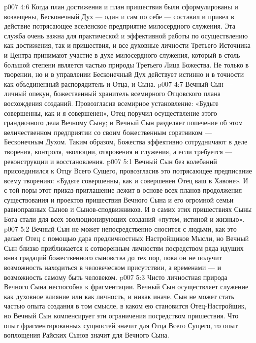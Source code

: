 \vs p007 4:6 \pc {}\bibnobreakspace {} Когда план достижения и план пришествия были сформулированы и возвещены, Бесконечный Дух --- один и сам по себе --- составил и привел в действие потрясающее вселенское предприятие милосердного служения. Эта служба очень важна для практической и эффективной работы по осуществлению как достижения, так и пришествия, и все духовные личности Третьего Источника и Центра принимают участие в духе милосердного служения, который в столь большой степени является частью природы Третьего Лица Божества. Не только в творении, но и в управлении Бесконечный Дух действует истинно и в точности как объединенный распорядитель и Отца, и Сына.
\vs p007 4:7 \pc Вечный Сын --- личный опекун, божественный хранитель всемирного Отцовского плана восхождения созданий. Провозгласив всемирное установление: «Будьте совершенны, как и я совершенен», Отец поручил осуществление этого грандиозного дела Вечному Сыну; и Вечный Сын разделяет попечение об этом величественном предприятии со своим божественным соратником --- Бесконечным Духом. Таким образом, Божества эффективно сотрудничают в деле творения, контроля, эволюции, откровения и служения, а если требуется --- реконструкции и восстановления.
\vs p007 5:1 Вечный Сын без колебаний присоединился к Отцу Всего Сущего, провозгласив это потрясающее предписание всему творению: «Будьте совершенны, как и совершенен Отец ваш в Хавоне». И с той поры этот приказ\hyp{}приглашение лежит в основе всех планов продолжения существования и проектов пришествия Вечного Сына и его огромной семьи равноправных Сынов и Сынов\hyp{}сподвижников. И в самих этих пришествиях Сыны Бога стали для всех эволюционирующих созданий «путем, истиной и жизнью».
\vs p007 5:2 \pc Вечный Сын не может непосредственно сносится с людьми, как это делает Отец с помощью дара предличностных Настройщиков Мысли, но Вечный Сын близко приближается к сотворенным личностям посредством ряда идущих вниз градаций божественного сыновства до тех пор, пока он не получит возможность находиться в человеческом присутствии, а временами --- и возможность самому быть человеком.
\vs p007 5:3 Чисто личностная природа Вечного Сына неспособна к фрагментации. Вечный Сын осуществляет служение как духовное влияние или как личность, и никак иначе. Сын не может стать частью опыта создания в том смысле, в каком ею становится Отец\hyp{}Настройщик, но Вечный Сын компенсирует эти ограничения посредством пришествия. Что опыт фрагментированных сущностей значит для Отца Всего Сущего, то опыт воплощения Райских Сынов значит для Вечного Сына.
